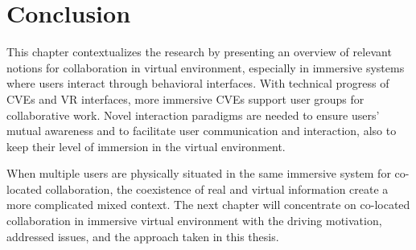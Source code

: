 \section{Conclusion}
This chapter contextualizes the research by presenting an overview of relevant notions for collaboration in virtual environment, especially in immersive systems where users interact through behavioral interfaces. With technical progress of CVEs and VR interfaces, more immersive CVEs support user groups for collaborative work. Novel interaction paradigms are needed to ensure users' mutual awareness and to facilitate user communication and interaction, also to keep their level of immersion in the virtual environment. 

When multiple users are physically situated in the same immersive system for co-located collaboration, the coexistence of real and virtual information create a more complicated mixed context. The next chapter will concentrate on co-located collaboration in immersive virtual environment with the driving motivation, addressed issues, and the approach taken in this thesis.
